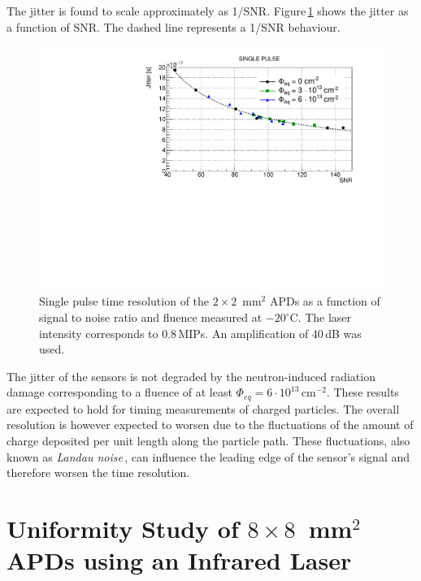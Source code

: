 \documentclass[review,number,sort&compress]{elsarticle}
\begin{document}
The jitter is found to scale approximately as 1/SNR.
Figure\,\ref{fig:timeRes2x2_snr} shows the jitter as a function of SNR.
The dashed line represents a 1/SNR behaviour.

\begin{figure}
  \centering
  \includegraphics[width = 0.6 \columnwidth]{timeRes2x2APDsNo1e15_SNR}
  \caption{Single pulse time resolution of the $2 \times 2$~mm$^2$ APDs as a function of signal to noise ratio and fluence measured at $-20^\circ$C. The laser intensity corresponds to 0.8\,MIPs. An amplification of 40\,dB was used.}
  \label{fig:timeRes2x2_snr}
\end{figure}

The jitter of the sensors is not degraded by the neutron-induced radiation damage corresponding to a fluence of at least $\Phi_{eq} = 6 \cdot 10^{13}$\,cm$^{-2}$.
These results are expected to hold for timing measurements of charged particles.
The overall resolution is however expected to worsen due to the fluctuations of the amount of charge deposited per unit length along the particle path.
These fluctuations, also known as {\em Landau noise}\,\cite{cartiglia2017}, can influence the leading edge of the sensor's signal and therefore worsen the time resolution.

\section{Uniformity Study of $8 \times 8$~mm$^2$ APDs using an Infrared Laser}
\label{sec:unif8x8laser}
\end{document}
